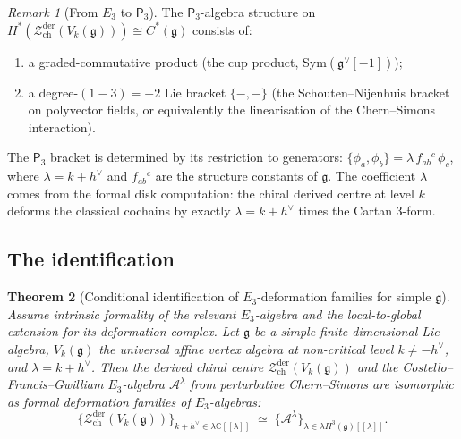 \documentclass[11pt,reqno]{amsart}
\newtheorem{theorem}{Theorem}[section]
\theoremstyle{definition}
\theoremstyle{remark}
\newtheorem{remark}[theorem]{Remark}
\providecommand{\cA}{\mathcal{A}}
\providecommand{\cZ}{\mathcal{Z}}
\providecommand{\fg}{\mathfrak{g}}
\providecommand{\Ethree}{E_3}
\providecommand{\Pthree}{\mathsf{P}_3}
\providecommand{\bC}{\mathbb{C}}
\providecommand{\Sym}{\mathrm{Sym}}
\begin{document}
\begin{remark}[From $\Ethree$ to $\Pthree$]
\label{rem:e-e3-to-p3}
The $\Pthree$-algebra structure on
$H^*(\cZ^{\mathrm{der}}_{\mathrm{ch}}(V_k(\fg)))
\cong C^*(\fg)$ consists of:
\begin{enumerate}[label=\textup{(\roman*)}]
\item a graded-commutative product (the cup product,
 $\Sym(\fg^\vee[-1])$);
\item a degree-$(1{-}3) = -2$ Lie bracket
 $\{-,-\}$ (the Schouten--Nijenhuis bracket on polyvector
 fields, or equivalently the linearisation of the
 Chern--Simons interaction).
\end{enumerate}
The $\Pthree$ bracket is determined by its restriction to
generators: $\{\phi_a, \phi_b\} = \lambda\,f_{ab}{}^c\,\phi_c$,
where $\lambda = k + h^\vee$ and $f_{ab}{}^c$ are the
structure constants of $\fg$. The coefficient $\lambda$ comes
from the formal disk computation: the chiral derived centre
at level $k$ deforms the classical cochains by exactly
$\lambda = k + h^\vee$ times the Cartan $3$-form.
\end{remark}

\subsection{The identification}

\begin{theorem}[Conditional identification of $\Ethree$-deformation families
for simple $\fg$]
\label{thm:e-e3-identification}
Assume intrinsic formality of the relevant $\Ethree$-algebra and the
local-to-global extension for its deformation complex. Let $\fg$ be a simple finite-dimensional Lie algebra,
$V_k(\fg)$ the universal affine vertex algebra at non-critical
level $k \neq -h^\vee$, and
$\lambda = k + h^\vee$. Then the derived chiral centre
$\cZ^{\mathrm{der}}_{\mathrm{ch}}(V_k(\fg))$ and the
Costello--Francis--Gwilliam $\Ethree$-algebra
$\cA^\lambda$ from perturbative Chern--Simons are isomorphic
as formal deformation families of $\Ethree$-algebras:
\begin{equation}\label{eq:e-e3-identification}
\bigl\{
\cZ^{\mathrm{der}}_{\mathrm{ch}}(V_k(\fg))
\bigr\}_{k + h^\vee \in \lambda\bC[[\lambda]]}
\;\simeq\;
\bigl\{
\cA^\lambda
\bigr\}_{\lambda \in \lambda H^3(\fg)[[\lambda]]}.
\end{equation}
\end{theorem}
\end{document}
